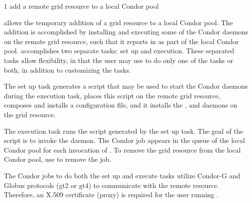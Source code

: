 \begin{ManPage}{\label{man-condor-glidein}}{1}
{add a remote grid resource to a local Condor pool}
\Synopsis
{}



\Description

 allows the temporary addition of a grid resource to
a local Condor pool.
The addition is accomplished by installing and executing some of the Condor
daemons on the remote grid resource,
such that it reports in as part of the local Condor pool.
 accomplishes two separate tasks: set up and execution.
These separated tasks allow flexibility, 
in that the user may use  to do only one
of the tasks or both, 
in addition to customizing the tasks.

The set up task generates a script that may be used
to start the Condor daemons during the execution task,
places this script on the remote grid resource,
composes and installs a configuration file,
and it installs the , 
and  daemons on the grid resource.

The execution task runs the script generated by
the set up task.
The goal of the script is to invoke the  daemon.
The Condor job  appears in the queue of the local
Condor pool for each invocation of  .
To remove the grid resource from the local Condor pool,
use  to remove the  job.

The Condor jobs to do both the set up and execute tasks
utilize
Condor-G and Globus protocols
(gt2 or gt4) to communicate with 
the remote resource.
Therefore,
an X.509 certificate (proxy) is required
for the user running .


\end{ManPage}
